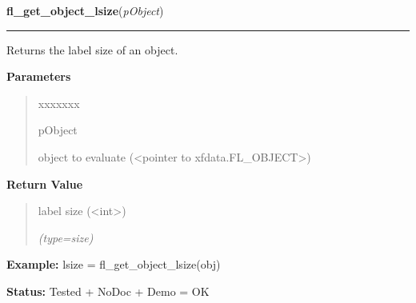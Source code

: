     \vspace{0.5ex}

\hspace{.8\funcindent}\begin{boxedminipage}{\funcwidth}

    \raggedright \textbf{fl\_get\_object\_lsize}(\textit{pObject})

    \vspace{-1.5ex}

    \rule{\textwidth}{0.5\fboxrule}
\setlength{\parskip}{2ex}
    Returns the label size of an object.

\setlength{\parskip}{1ex}
      \textbf{Parameters}
      \vspace{-1ex}

      \begin{quote}
        \begin{Ventry}{xxxxxxx}

          \item[pObject]

          object to evaluate ({\textless}pointer to 
          xfdata.FL\_OBJECT{\textgreater})

        \end{Ventry}

      \end{quote}

      \textbf{Return Value}
    \vspace{-1ex}

      \begin{quote}
      label size ({\textless}int{\textgreater})

      {\it (type=size)}

      \end{quote}

\textbf{Example:} lsize = fl\_get\_object\_lsize(obj)



\textbf{Status:} Tested + NoDoc + Demo = OK



    \end{boxedminipage}

    \label{xformslib:library:fl_set_object_lstyle}

    \vspace{0.5ex}

